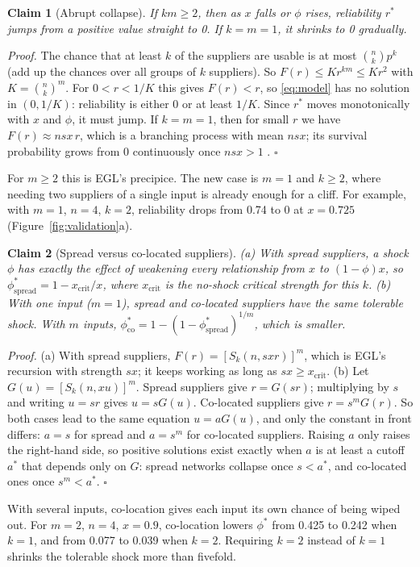 \documentclass[10pt]{article}
\newtheorem{claim}{Claim}
\newcommand{\xc}{x_{\mathrm{crit}}}
\begin{document}
\begin{claim}[Abrupt collapse]\label{thm:abrupt}
If $km\ge2$, then as $x$ falls or $\phi$ rises, reliability $r^*$ jumps from a positive value straight to 0. If $k=m=1$, it shrinks to 0 gradually.
\end{claim}
\noindent\emph{Proof.} The chance that at least $k$ of the suppliers are usable is at most $\binom{n}{k}p^k$ (add up the chances over all groups of $k$ suppliers). So $F(r)\le K r^{km}\le Kr^2$ with $K=\binom{n}{k}^m$. For $0<r<1/K$ this gives $F(r)<r$, so \eqref{eq:model} has no solution in $(0,1/K)$: reliability is either 0 or at least $1/K$. Since $r^*$ moves monotonically with $x$ and $\phi$, it must jump. If $k=m=1$, then for small $r$ we have $F(r)\approx nsx\,r$, which is a branching process with mean $nsx$; its survival probability grows from 0 continuously once $nsx>1$ \cite[\S21.8]{ek2010}. $\square$

\noindent For $m\ge2$ this is EGL's precipice. The new case is $m=1$ and $k\ge2$, where needing two suppliers of a single input is already enough for a cliff. For example, with $m=1$, $n=4$, $k=2$, reliability drops from 0.74 to 0 at $x=0.725$ (Figure~\ref{fig:validation}a).

\begin{claim}[Spread versus co-located suppliers]\label{thm:closed}
(a) With spread suppliers, a shock $\phi$ has exactly the effect of weakening every relationship from $x$ to $(1-\phi)x$, so $\phi^*_{\mathrm{spread}}=1-\xc/x$, where $\xc$ is the no-shock critical strength for this $k$. (b) With one input ($m=1$), spread and co-located suppliers have the same tolerable shock. With $m$ inputs, $\phi^*_{\mathrm{co}}=1-(1-\phi^*_{\mathrm{spread}})^{1/m}$, which is smaller.
\end{claim}
\noindent\emph{Proof.} (a) With spread suppliers, $F(r)=[S_k(n,sxr)]^m$, which is EGL's recursion with strength $sx$; it keeps working as long as $sx\ge\xc$. (b) Let $G(u)=[S_k(n,xu)]^m$. Spread suppliers give $r=G(sr)$; multiplying by $s$ and writing $u=sr$ gives $u=sG(u)$. Co-located suppliers give $r=s^mG(r)$. So both cases lead to the same equation $u=aG(u)$, and only the constant in front differs: $a=s$ for spread and $a=s^m$ for co-located suppliers. Raising $a$ only raises the right-hand side, so positive solutions exist exactly when $a$ is at least a cutoff $a^*$ that depends only on $G$: spread networks collapse once $s<a^*$, and co-located ones once $s^m<a^*$. $\square$

\noindent With several inputs, co-location gives each input its own chance of being wiped out. For $m=2$, $n=4$, $x=0.9$, co-location lowers $\phi^*$ from 0.425 to 0.242 when $k=1$, and from 0.077 to 0.039 when $k=2$. Requiring $k=2$ instead of $k=1$ shrinks the tolerable shock more than fivefold.
\end{document}
